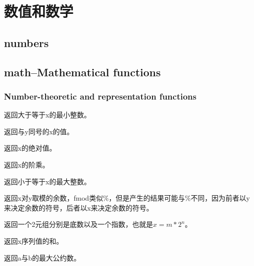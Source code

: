 \chapter{数值和数学}
\section{numbers}




\section{math--Mathematical functions}
\subsection{Number-theoretic and representation functions}
\noindent{\color{red}{math.ceil(x):}}
\par{返回大于等于x的最小整数。}\\

\noindent{\color{red}{math.copysign(x, y):}}
\par{返回与y同号的x的值。}\\

\noindent{\color{red}{math.fabs(x):}}
\par{返回x的绝对值。}\\

\noindent{\color{red}{math.factorial(x):}}
\par{返回x的阶乘。}\\

\noindent{\color{red}{math.floor(x):}}
\par{返回小于等于x的最大整数。}\\

\noindent{\color{red}{math.fmod(x, y):}}
\par{返回x对y取模的余数，fmod类似\%，但是产生的结果可能与\%不同，因为前者以y来决定余数的符号，后者以x来决定余数的符号。}\\

\noindent{\color{red}{math.frexp(x):}}
\par{返回一个2元组分别是底数以及一个指数，也就是$x=m*2^n$。}\\

\noindent{\color{red}{math.fsun(iterable):}}
\par{返回x序列值的和。}\\

\noindent{\color{red}{math.gcd(a, b):}}
\par{返回a与b的最大公约数。}\\

